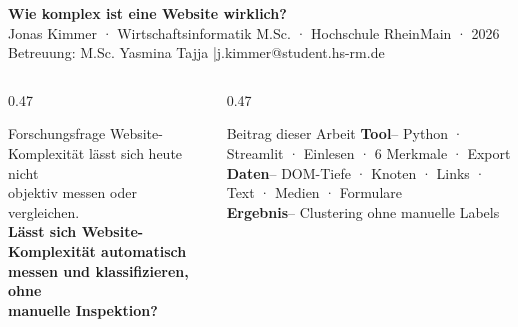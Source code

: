 \documentclass[final]{beamer}
\newlength{\sepwidth}\setlength{\sepwidth}{0.025\textwidth}
\begin{document}
\begin{frame}[t]{}


\vspace{1.0cm}
{\color{white}\fontsize{52}{62}\selectfont\bfseries
  Wie komplex ist eine Website wirklich?}\\[0.6cm]
{\color{white}\fontsize{24}{30}\selectfont
  Jonas Kimmer · Wirtschaftsinformatik M.Sc. · Hochschule RheinMain · 2026}\\[0.3cm]
{\color{soft}\fontsize{20}{26}\selectfont
  Betreuung: M.Sc. Yasmina Tajja \quad|\quad j.kimmer@student.hs-rm.de}
\vspace{2.0cm}

\begin{columns}[T]
\begin{column}{0.47\textwidth}
  \begin{alertblock}{Forschungsfrage}
    \vspace{0.3em}
    \large
    Website-Komplexität lässt sich heute nicht\\
    objektiv messen oder vergleichen.\\[0.5em]
    \LARGE\bfseries
    Lässt sich Website-Komplexität automatisch\\
    messen und klassifizieren, ohne\\
    manuelle Inspektion?
    \vspace{0.3em}
  \end{alertblock}
\end{column}
\hspace{\sepwidth}
\begin{column}{0.47\textwidth}
  \begin{block}{Beitrag dieser Arbeit}
    \vspace{0.4em}
    {\large
    \textcolor{primary}{\bfseries Tool\enskip}--\enskip
      Python · Streamlit · Einlesen · 6 Merkmale · Export\\[0.5em]
    \textcolor{primary}{\bfseries Daten\enskip}--\enskip
      DOM-Tiefe · Knoten · Links · Text · Medien · Formulare\\[0.5em]
    \textcolor{primary}{\bfseries Ergebnis\enskip}--\enskip
      Clustering ohne manuelle Labels
    }
    \vspace{0.3em}
  \end{block}
\end{column}
\end{columns}


\end{frame}
\end{document}
